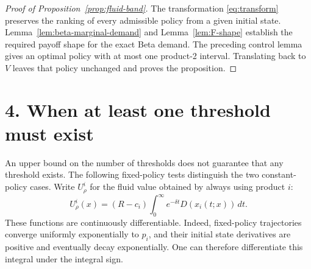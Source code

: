 \documentclass[11pt]{article}
\begin{document}
\begin{proof}[Proof of Proposition~\ref{prop:fluid-band}]
The transformation \eqref{eq:transform} preserves the ranking of every
admissible policy from a given initial state. Lemma~\ref{lem:beta-marginal-demand}
and Lemma~\ref{lem:F-shape} establish the required payoff shape for the exact
Beta demand. The preceding control lemma gives an optimal policy with at
most one product-2 interval. Translating back to $V$ leaves that policy
unchanged and proves the proposition.
\end{proof}

\section*{4. When at least one threshold must exist}
An upper bound on the number of thresholds does not guarantee that any
threshold exists. The following fixed-policy tests distinguish the two
constant-policy cases. Write $U^i_\rho$ for the fluid value obtained by
always using product $i$:
\begin{equation*}
U^i_\rho(x)=(R-c_i)\int_0^\infty e^{-\delta t}D(x_i(t;x))\,dt.
\end{equation*}
These functions are continuously differentiable. Indeed, fixed-policy
trajectories converge uniformly exponentially to $p_i$, and their initial
state derivatives are positive and eventually decay exponentially. One
can therefore differentiate this integral under the integral sign.
\end{document}
